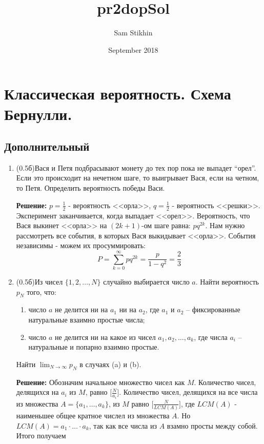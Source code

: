 \documentclass[a4paper, 14pt]{extarticle}
\title{pr2dopSol}
\author{Sam Stikhin}
\date{September 2018}
\begin{document}
\section*{Классическая вероятность. Схема Бернулли.}
\subsection*{Дополнительный}
\begin{enumerate}
\item (0.5б)Вася и Петя подбрасывают монету до тех пор пока не выпадет ``орел''. Если это происходит на нечетном шаге, то выигрывает Вася, если на четном, то Петя. Определить вероятность победы Васи.

	
\textbf{Решение:}
$p=\frac{1}{2}$ - вероятность <<орла>>, $q=\frac{1}{2}$ - вероятность <<решки>>. Эксперимент заканчивается, когда выпадает <<орел>>. Вероятность, что Вася выкинет <<орла>> на $(2k+1)$-ом шаге равна: $p q^{2k}$. Нам нужно рассмотреть все события, в которых Вася выкидывает <<орла>>. События независимы - можем их просуммировать:
$$P = \sum_{k=0}^{\infty} p q^{2k}= \frac{p}{1-q^2} = \frac{2}{3}$$



\item (0.5б)Из чисел $\{1, 2, \ldots, N\}$ случайно выбирается
	число $a$. Найти вероятность $p_N$ того, что: 
	\begin{enumerate}
	    \item число $a$ не делится ни на $a_1$ ни на $a_2$, где $a_1$ и $a_2$ -- фиксированные натуральные взаимно простые числа;
	\item число $a$
	не делится ни на какое из чисел $a_1, a_2, \ldots, a_k$, где
	числа $a_i$ -- натуральные и попарно взаимно простые.
	\end{enumerate}
	Найти $\lim_{N\rightarrow\infty} p_N$ в случаях (a) и (b).
	
\textbf{Решение:}
Обозначим начальное множество чисел как $M$. Количество чисел, делящихся на $a_i$ из $M$, равно $\Big[\frac{N}{a_i}\Big]$. Количество чисел, делящихся на все числа из множества $A = \{a_1,\ldots,a_k\}$, из $M$ равно $\Big[\frac{N}{LCM(A)}\Big]$, где $LCM(A)$ - наименьшее общее кратное числел из множества $A$. Но $LCM(A) = a_1 \cdot \ldots \cdot a_k$, так как все числа из $A$ взамно просты между собой. Итого получаем


\end{enumerate}
\end{document}
